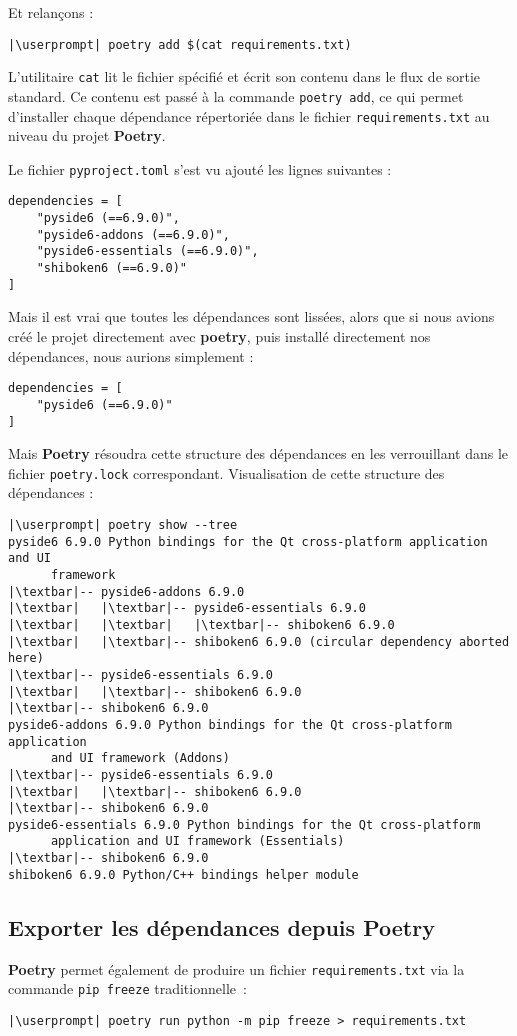 Et relançons :
\begin{lstlisting}[style=bash]
|\userprompt| poetry add $(cat requirements.txt)
\end{lstlisting}

L’utilitaire \texttt{cat} lit le fichier spécifié et écrit son contenu dans le flux de sortie standard. Ce contenu est passé à la commande \texttt{poetry add}, ce qui permet d'installer chaque dépendance répertoriée dans le fichier \texttt{requirements.txt} au niveau du projet \textbf{Poetry}.

Le fichier \texttt{pyproject.toml} s'est vu ajouté les lignes suivantes :
\begin{lstlisting}[style=file]
dependencies = [
    "pyside6 (==6.9.0)",
    "pyside6-addons (==6.9.0)",
    "pyside6-essentials (==6.9.0)",
    "shiboken6 (==6.9.0)"
]
\end{lstlisting}

Mais il est vrai que toutes les dépendances sont lissées, alors que si nous avions créé le projet directement avec \textbf{poetry}, puis installé directement nos dépendances, nous aurions simplement :
\begin{lstlisting}[style=file]
dependencies = [
    "pyside6 (==6.9.0)"
]
\end{lstlisting}

Mais \textbf{Poetry} résoudra cette structure des dépendances en les verrouillant dans le fichier \texttt{poetry.lock} correspondant. Visualisation de cette structure des dépendances :
\begin{lstlisting}[style=bash]
|\userprompt| poetry show --tree
pyside6 6.9.0 Python bindings for the Qt cross-platform application and UI 
      framework
|\textbar|-- pyside6-addons 6.9.0
|\textbar|   |\textbar|-- pyside6-essentials 6.9.0
|\textbar|   |\textbar|   |\textbar|-- shiboken6 6.9.0
|\textbar|   |\textbar|-- shiboken6 6.9.0 (circular dependency aborted here)
|\textbar|-- pyside6-essentials 6.9.0
|\textbar|   |\textbar|-- shiboken6 6.9.0
|\textbar|-- shiboken6 6.9.0
pyside6-addons 6.9.0 Python bindings for the Qt cross-platform application 
      and UI framework (Addons)
|\textbar|-- pyside6-essentials 6.9.0
|\textbar|   |\textbar|-- shiboken6 6.9.0
|\textbar|-- shiboken6 6.9.0
pyside6-essentials 6.9.0 Python bindings for the Qt cross-platform 
      application and UI framework (Essentials)
|\textbar|-- shiboken6 6.9.0
shiboken6 6.9.0 Python/C++ bindings helper module
\end{lstlisting}

\subsection*{Exporter les dépendances depuis \textbf{Poetry}}
\textbf{Poetry} permet également de produire un fichier \texttt{requirements.txt} via la commande \texttt{pip freeze} traditionnelle :
\begin{lstlisting}[style=bash]
|\userprompt| poetry run python -m pip freeze > requirements.txt
\end{lstlisting}

